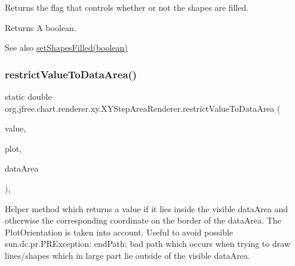 Returns the flag that controls whether or not the shapes are filled.

\begin{DoxyReturn}{Returns}
A boolean.
\end{DoxyReturn}
\begin{DoxySeeAlso}{See also}
\mbox{\hyperlink{classorg_1_1jfree_1_1chart_1_1renderer_1_1xy_1_1_x_y_step_area_renderer_a3a37119cd10d3facbcdb0d8bb00e9738}{set\+Shapes\+Filled(boolean)}} 
\end{DoxySeeAlso}
\mbox{\label{classorg_1_1jfree_1_1chart_1_1renderer_1_1xy_1_1_x_y_step_area_renderer_acaa718b73a7ee9ce33644aa90c19fe70}} 
\subsubsection{\texorpdfstring{restrict\+Value\+To\+Data\+Area()}{restrictValueToDataArea()}}
{\footnotesize\ttfamily static double org.\+jfree.\+chart.\+renderer.\+xy.\+X\+Y\+Step\+Area\+Renderer.\+restrict\+Value\+To\+Data\+Area (\begin{DoxyParamCaption}\item[{double}]{value,  }\item[{\mbox{\hyperlink{classorg_1_1jfree_1_1chart_1_1plot_1_1_x_y_plot}{X\+Y\+Plot}}}]{plot,  }\item[{Rectangle2D}]{data\+Area }\end{DoxyParamCaption})\hspace{0.3cm}{\ttfamily [static]}, {\ttfamily [protected]}}

Helper method which returns a value if it lies inside the visible data\+Area and otherwise the corresponding coordinate on the border of the data\+Area. The Plot\+Orientation is taken into account. Useful to avoid possible sun.\+dc.\+pr.\+P\+R\+Exception\+: end\+Path\+: bad path which occurs when trying to draw lines/shapes which in large part lie outside of the visible data\+Area.


